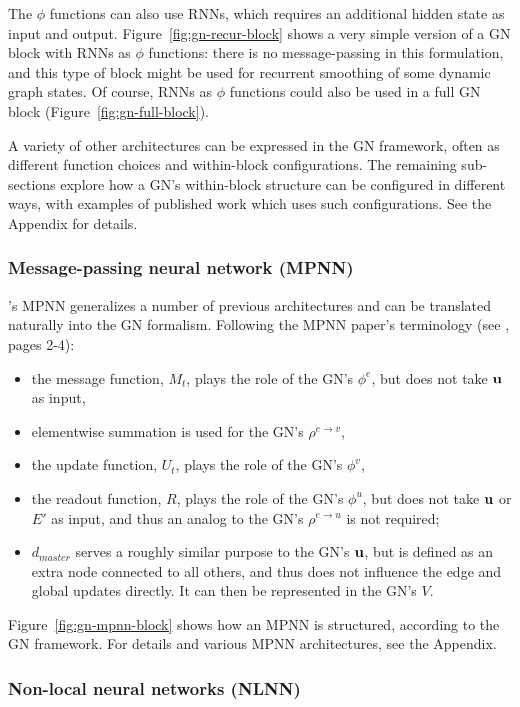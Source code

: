 The $\phi$ functions can also use RNNs, which requires an additional hidden state as input and output. Figure~\ref{fig:gn-recur-block} shows a very simple version of a GN block with RNNs as $\phi$ functions: there is no message-passing in this formulation, and this type of block might be used for recurrent smoothing of some dynamic graph states. Of course, RNNs as $\phi$ functions could also be used in a full GN block (Figure~\ref{fig:gn-full-block}).

A variety of other architectures can be expressed in the GN framework, often as different function choices and within-block configurations. The remaining sub-sections explore how a GN's within-block structure can be configured in different ways, with examples of published work which uses such configurations. See the Appendix for details.


\subsubsection{Message-passing neural network (MPNN)}
\cite{gilmer2017neural}'s MPNN generalizes a number of previous architectures and can be translated naturally into the GN formalism. 
Following the MPNN paper's terminology (see \cite{gilmer2017neural}, pages 2-4): 
\begin{itemize}[noitemsep]
\item the message function, $M_t$, plays the role of the GN's $\phi^e$, but does not take $\mathbf{u}$ as input,
\item elementwise summation is used for the GN's $\rho^{e\rightarrow v}$,
\item the update function, $U_t$, plays the role of the GN's $\phi^v$,
\item the readout function, $R$, plays the role of the GN's $\phi^u$, but does not take $\mathbf{u}$ or $E'$ as input, and thus an analog to the GN's $\rho^{e\rightarrow u}$ is not required;
\item $d_{master}$ serves a roughly similar purpose to the GN's $\mathbf{u}$, but is defined as an extra node connected to all others, and thus does not influence the edge and global updates directly. It can then be represented in the GN's $V$.
\end{itemize}
Figure~\ref{fig:gn-mpnn-block} shows how an MPNN is structured, according to the GN framework. For details and various MPNN architectures, see the Appendix.


\subsubsection{Non-local neural networks (NLNN)}

